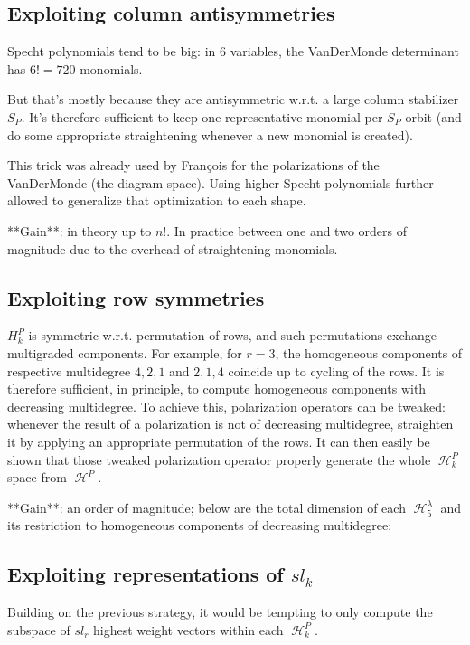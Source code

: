 \documentclass[letter,12pt]{article}
\DeclareMathOperator{\harmonics}{\mathcal{H}}
\begin{document}
	\subsection{Exploiting column antisymmetries}
	
	Specht polynomials tend to be big: in $6$ variables, the VanDerMonde determinant has $6!=720$ monomials.
	
	But that's mostly because they are antisymmetric w.r.t. a large column stabilizer $S_P$. It's therefore sufficient to keep one representative monomial per $S_P$ orbit (and do some appropriate straightening whenever a new monomial is created). 
	
	This trick was already used by François for the polarizations of the VanDerMonde (the diagram space). Using higher Specht polynomials further allowed  to generalize that optimization to each shape.
	
	**Gain**: in theory up to $n!$. In practice between one and two orders of magnitude due to the overhead of straightening monomials.
	
	\subsection{Exploiting row symmetries}
	
	$H_k^P$ is symmetric w.r.t. permutation of rows, and such permutations
	exchange multigraded components. For example, for $r=3$, the homogeneous components of respective multidegree $4,2,1$ and $2,1,4$ coincide
	up to cycling of the rows. It is therefore sufficient, in principle, to compute homogeneous components with decreasing multidegree.
	To achieve this, polarization operators can be tweaked: whenever the result of a polarization is not of decreasing multidegree, straighten it by applying an appropriate permutation of the rows. It can then easily be shown that those tweaked polarization operator properly generate the whole $\harmonics_k^P$ space from $\harmonics^P$.
	
	**Gain**: an order of magnitude; below are the total dimension of each $\harmonics_5^\lambda$ and its restriction to homogeneous components of decreasing multidegree:
	
	\subsection{Exploiting representations of $sl_k$}
	
	Building on the previous strategy, it would be tempting to only compute the subspace of $sl_r$ highest weight vectors within each $\harmonics_k^P$.
	
\end{document}
